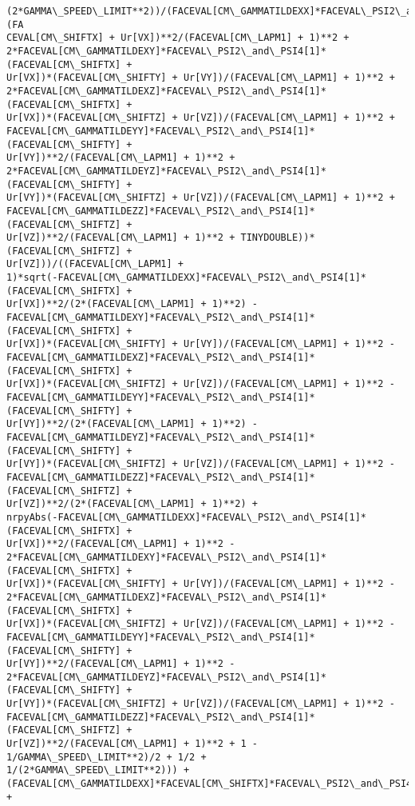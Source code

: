 \documentclass[landscape,letterpaper,10pt,english]{article}
\begin{document}
\begin{Verbatim}[commandchars=\\\{\}]
(2*GAMMA\_SPEED\_LIMIT**2))/(FACEVAL[CM\_GAMMATILDEXX]*FACEVAL\_PSI2\_and\_PSI4[1]*(FA
CEVAL[CM\_SHIFTX] + Ur[VX])**2/(FACEVAL[CM\_LAPM1] + 1)**2 +
2*FACEVAL[CM\_GAMMATILDEXY]*FACEVAL\_PSI2\_and\_PSI4[1]*(FACEVAL[CM\_SHIFTX] +
Ur[VX])*(FACEVAL[CM\_SHIFTY] + Ur[VY])/(FACEVAL[CM\_LAPM1] + 1)**2 +
2*FACEVAL[CM\_GAMMATILDEXZ]*FACEVAL\_PSI2\_and\_PSI4[1]*(FACEVAL[CM\_SHIFTX] +
Ur[VX])*(FACEVAL[CM\_SHIFTZ] + Ur[VZ])/(FACEVAL[CM\_LAPM1] + 1)**2 +
FACEVAL[CM\_GAMMATILDEYY]*FACEVAL\_PSI2\_and\_PSI4[1]*(FACEVAL[CM\_SHIFTY] +
Ur[VY])**2/(FACEVAL[CM\_LAPM1] + 1)**2 +
2*FACEVAL[CM\_GAMMATILDEYZ]*FACEVAL\_PSI2\_and\_PSI4[1]*(FACEVAL[CM\_SHIFTY] +
Ur[VY])*(FACEVAL[CM\_SHIFTZ] + Ur[VZ])/(FACEVAL[CM\_LAPM1] + 1)**2 +
FACEVAL[CM\_GAMMATILDEZZ]*FACEVAL\_PSI2\_and\_PSI4[1]*(FACEVAL[CM\_SHIFTZ] +
Ur[VZ])**2/(FACEVAL[CM\_LAPM1] + 1)**2 + TINYDOUBLE))*(FACEVAL[CM\_SHIFTZ] +
Ur[VZ]))/((FACEVAL[CM\_LAPM1] +
1)*sqrt(-FACEVAL[CM\_GAMMATILDEXX]*FACEVAL\_PSI2\_and\_PSI4[1]*(FACEVAL[CM\_SHIFTX] +
Ur[VX])**2/(2*(FACEVAL[CM\_LAPM1] + 1)**2) -
FACEVAL[CM\_GAMMATILDEXY]*FACEVAL\_PSI2\_and\_PSI4[1]*(FACEVAL[CM\_SHIFTX] +
Ur[VX])*(FACEVAL[CM\_SHIFTY] + Ur[VY])/(FACEVAL[CM\_LAPM1] + 1)**2 -
FACEVAL[CM\_GAMMATILDEXZ]*FACEVAL\_PSI2\_and\_PSI4[1]*(FACEVAL[CM\_SHIFTX] +
Ur[VX])*(FACEVAL[CM\_SHIFTZ] + Ur[VZ])/(FACEVAL[CM\_LAPM1] + 1)**2 -
FACEVAL[CM\_GAMMATILDEYY]*FACEVAL\_PSI2\_and\_PSI4[1]*(FACEVAL[CM\_SHIFTY] +
Ur[VY])**2/(2*(FACEVAL[CM\_LAPM1] + 1)**2) -
FACEVAL[CM\_GAMMATILDEYZ]*FACEVAL\_PSI2\_and\_PSI4[1]*(FACEVAL[CM\_SHIFTY] +
Ur[VY])*(FACEVAL[CM\_SHIFTZ] + Ur[VZ])/(FACEVAL[CM\_LAPM1] + 1)**2 -
FACEVAL[CM\_GAMMATILDEZZ]*FACEVAL\_PSI2\_and\_PSI4[1]*(FACEVAL[CM\_SHIFTZ] +
Ur[VZ])**2/(2*(FACEVAL[CM\_LAPM1] + 1)**2) +
nrpyAbs(-FACEVAL[CM\_GAMMATILDEXX]*FACEVAL\_PSI2\_and\_PSI4[1]*(FACEVAL[CM\_SHIFTX] +
Ur[VX])**2/(FACEVAL[CM\_LAPM1] + 1)**2 -
2*FACEVAL[CM\_GAMMATILDEXY]*FACEVAL\_PSI2\_and\_PSI4[1]*(FACEVAL[CM\_SHIFTX] +
Ur[VX])*(FACEVAL[CM\_SHIFTY] + Ur[VY])/(FACEVAL[CM\_LAPM1] + 1)**2 -
2*FACEVAL[CM\_GAMMATILDEXZ]*FACEVAL\_PSI2\_and\_PSI4[1]*(FACEVAL[CM\_SHIFTX] +
Ur[VX])*(FACEVAL[CM\_SHIFTZ] + Ur[VZ])/(FACEVAL[CM\_LAPM1] + 1)**2 -
FACEVAL[CM\_GAMMATILDEYY]*FACEVAL\_PSI2\_and\_PSI4[1]*(FACEVAL[CM\_SHIFTY] +
Ur[VY])**2/(FACEVAL[CM\_LAPM1] + 1)**2 -
2*FACEVAL[CM\_GAMMATILDEYZ]*FACEVAL\_PSI2\_and\_PSI4[1]*(FACEVAL[CM\_SHIFTY] +
Ur[VY])*(FACEVAL[CM\_SHIFTZ] + Ur[VZ])/(FACEVAL[CM\_LAPM1] + 1)**2 -
FACEVAL[CM\_GAMMATILDEZZ]*FACEVAL\_PSI2\_and\_PSI4[1]*(FACEVAL[CM\_SHIFTZ] +
Ur[VZ])**2/(FACEVAL[CM\_LAPM1] + 1)**2 + 1 - 1/GAMMA\_SPEED\_LIMIT**2)/2 + 1/2 +
1/(2*GAMMA\_SPEED\_LIMIT**2))) +
(FACEVAL[CM\_GAMMATILDEXX]*FACEVAL[CM\_SHIFTX]*FACEVAL\_PSI2\_and\_PSI4[1] +

\end{Verbatim}
\end{document}
